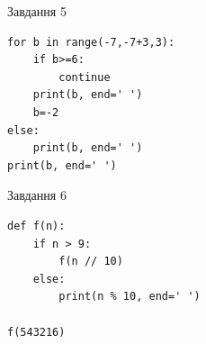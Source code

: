 \documentclass[12pt, ukrainian]{article}
\begin{document}
{\vspace{15mm}
\begin{minipage}[t]{9.7cm}                
{\begin{center}Завдання {5}\end{center}}
\begin{verbatim}
for b in range(-7,-7+3,3):
    if b>=6:
        continue
    print(b, end=' ')
    b=-2
else:
    print(b, end=' ')
print(b, end=' ')
\end{verbatim}     
\end{minipage}
\vline \hspace{8mm}
\begin{minipage}[t]{8.0cm}                
{\begin{center}Завдання {6}\end{center}}
\begin{verbatim}
def f(n):
    if n > 9:
        f(n // 10)
    else:
        print(n % 10, end=' ')

f(543216)
\end{verbatim}     
\end{minipage}

}
\newpage
\end{document}

